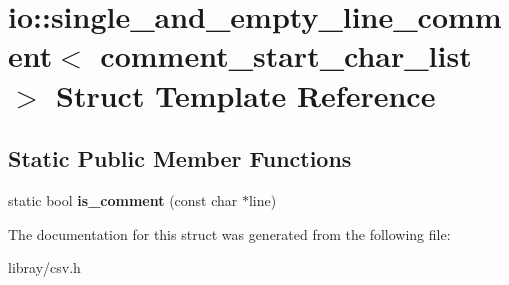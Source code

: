 \hypertarget{structio_1_1single__and__empty__line__comment}{}\section{io\+:\+:single\+\_\+and\+\_\+empty\+\_\+line\+\_\+comment$<$ comment\+\_\+start\+\_\+char\+\_\+list $>$ Struct Template Reference}
\label{structio_1_1single__and__empty__line__comment}
\subsection*{Static Public Member Functions}
\begin{DoxyCompactItemize}
\item 
\mbox{\label{structio_1_1single__and__empty__line__comment_a93a1556dfe4d7e6e3a674d576c4b30f4}} 
static bool {\bfseries is\+\_\+comment} (const char $\ast$line)
\end{DoxyCompactItemize}


The documentation for this struct was generated from the following file\+:\begin{DoxyCompactItemize}
\item 
libray/csv.\+h\end{DoxyCompactItemize}

